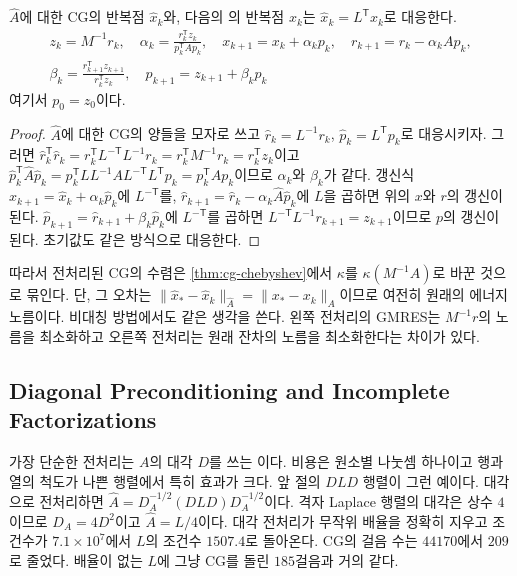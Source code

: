 \begin{proposition}
\label{prop:pcg}
$\hat A$에 대한 CG의 반복점 $\hat x_k$와, 다음의 의 반복점 $x_k$는 $\hat x_k=L^{\mathsf T}x_k$로 대응한다.
\begin{gather*}
z_k=M^{-1}r_k,\quad\alpha_k=\frac{r_k^{\mathsf T}z_k}{p_k^{\mathsf T}Ap_k},\quad x_{k+1}=x_k+\alpha_kp_k,\quad r_{k+1}=r_k-\alpha_kAp_k,\\
\beta_k=\frac{r_{k+1}^{\mathsf T}z_{k+1}}{r_k^{\mathsf T}z_k},\quad p_{k+1}=z_{k+1}+\beta_kp_k
\end{gather*}
여기서 $p_0=z_0$이다.
\end{proposition}

\begin{proof}
$\hat A$에 대한 CG의 양들을 모자로 쓰고 $\hat r_k=L^{-1}r_k$, $\hat p_k=L^{\mathsf T}p_k$로 대응시키자. 그러면 $\hat r_k^{\mathsf T}\hat r_k=r_k^{\mathsf T}L^{-\mathsf T}L^{-1}r_k=r_k^{\mathsf T}M^{-1}r_k=r_k^{\mathsf T}z_k$이고 $\hat p_k^{\mathsf T}\hat A\hat p_k=p_k^{\mathsf T}LL^{-1}AL^{-\mathsf T}L^{\mathsf T}p_k=p_k^{\mathsf T}Ap_k$이므로 $\alpha_k$와 $\beta_k$가 같다. 갱신식 $\hat x_{k+1}=\hat x_k+\alpha_k\hat p_k$에 $L^{-\mathsf T}$를, $\hat r_{k+1}=\hat r_k-\alpha_k\hat A\hat p_k$에 $L$을 곱하면 위의 $x$와 $r$의 갱신이 된다. $\hat p_{k+1}=\hat r_{k+1}+\beta_k\hat p_k$에 $L^{-\mathsf T}$를 곱하면 $L^{-\mathsf T}L^{-1}r_{k+1}=z_{k+1}$이므로 $p$의 갱신이 된다. 초기값도 같은 방식으로 대응한다.
\end{proof}

따라서 전처리된 CG의 수렴은 \cref{thm:cg-chebyshev}에서 $\kappa$를 $\kappa(M^{-1}A)$로 바꾼 것으로 묶인다. 단, 그 오차는 $\|\hat x_\ast-\hat x_k\|_{\hat A}=\|x_\ast-x_k\|_A$이므로 여전히 원래의 에너지 노름이다. 비대칭 방법에서도 같은 생각을 쓴다. 왼쪽 전처리의 GMRES는 $M^{-1}r$의 노름을 최소화하고 오른쪽 전처리는 원래 잔차의 노름을 최소화한다는 차이가 있다.

\subsection{Diagonal Preconditioning and Incomplete Factorizations}

가장 단순한 전처리는 $A$의 대각 $D$를 쓰는 이다. 비용은 원소별 나눗셈 하나이고 행과 열의 척도가 나쁜 행렬에서 특히 효과가 크다. 앞 절의 $DLD$ 행렬이 그런 예이다. 대각으로 전처리하면 $\hat A=D_A^{-1/2}(DLD)D_A^{-1/2}$이다. 격자 Laplace 행렬의 대각은 상수 $4$이므로 $D_A=4D^2$이고 $\hat A=L/4$이다. 대각 전처리가 무작위 배율을 정확히 지우고 조건수가 $7.1\times10^7$에서 $L$의 조건수 $1507.4$로 돌아온다. CG의 걸음 수는 $44170$에서 $209$로 줄었다. 배율이 없는 $L$에 그냥 CG를 돌린 $185$걸음과 거의 같다.

